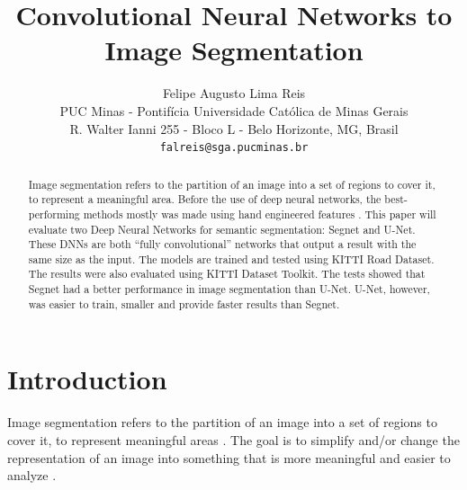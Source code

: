 \documentclass[10pt,twocolumn,letterpaper]{article}
\begin{document}
\title{Convolutional Neural Networks to Image Segmentation}

\author{Felipe Augusto Lima Reis\\
PUC Minas - Pontif\'icia Universidade Cat\'olica de Minas Gerais\\
R. Walter Ianni 255 - Bloco L - Belo Horizonte, MG, Brasil\\
{\tt\small falreis@sga.pucminas.br}
}

\maketitle


\begin{abstract}
    Image segmentation refers to the partition of an image into a set of regions to cover it, to represent a meaningful area. Before the use of deep neural networks, the best-performing methods mostly was made using hand engineered features \cite{SEGNET}. This paper will evaluate two Deep Neural Networks for semantic segmentation: Segnet and U-Net. These DNNs are both ``fully convolutional'' networks that output a result with the same size as the input. The models are trained and tested using KITTI Road Dataset. The results were also evaluated using KITTI Dataset Toolkit. The tests showed that Segnet had a better performance in image segmentation than U-Net. U-Net, however, was easier to train, smaller and provide faster results than Segnet.
\end{abstract}



\section{Introduction} \label{introduction}

Image segmentation refers to the partition of an image into a set of regions to cover it, to represent meaningful areas \cite{DOMINGUEZ}. The goal is to simplify and/or change the representation of an image into something that is more meaningful and easier to analyze \cite{AHMED_SARMA}.
\end{document}
